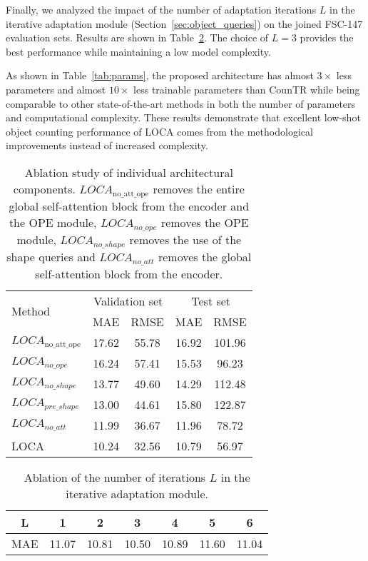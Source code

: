 \documentclass[10pt,twocolumn,letterpaper]{article}
\begin{document}
Finally, we analyzed the impact of the number of adaptation iterations $L$ in the iterative adaptation module (Section~\ref{sec:object_queries}) on the joined FSC-147 evaluation sets. 
Results are shown in Table~\ref{tab:ablation_L}. 
The choice of $L=3$ provides the best performance while maintaining a low model complexity.

 As shown in Table~\ref{tab:params}, the proposed architecture has almost $3 \times$ less parameters and almost $10 \times$ less trainable parameters than CounTR while being comparable to other state-of-the-art methods in both the number of parameters and computational complexity.
These results demonstrate that excellent low-shot object counting performance of LOCA comes from the methodological improvements instead of increased complexity.



\begin{table}[htbp]
    \centering
    \begin{tabular}{l c c c c}
        \toprule
        \multirow{2}{*}{Method}& \multicolumn{2}{c}{Validation set} & \multicolumn{2}{c}{Test set} \\
        & MAE & RMSE & MAE & RMSE \\ 
        \midrule
        $LOCA_\mathrm{no\_att\_ope}$  & 17.62 & 55.78 & 16.92 & 101.96 \\
        $LOCA_{no\_ope}$  & 16.24 & 57.41 & 15.53 & 96.23 \\
        $LOCA_{no\_shape}$   & 13.77 & 49.60 & 14.29 & 112.48 \\
        $LOCA_{pre\_shape}$   & 13.00 & 44.61 & 15.80 & 122.87 \\
        $LOCA_{no\_att}$ & 11.99 & 36.67 & 11.96 & 78.72 \\
        LOCA               & 10.24 & 32.56 & 10.79 & 56.97 \\
        \bottomrule
    \end{tabular}
    \caption{Ablation study of individual architectural components. $LOCA_\mathrm{no\_att\_ope}$ removes the entire global self-attention block from the encoder and the OPE module,  $LOCA_{no\_ope}$ removes the OPE module, $LOCA_{no\_shape}$ removes the use of the shape queries and $LOCA_{no\_att}$ removes the global self-attention block from the encoder.}
    \label{tab:ablation_components}
\end{table}





\begin{table}[htbp]
    \centering
    \begin{tabular}{c c c c c c c}
        \toprule
        L & 1 & 2 & 3 & 4 & 5 & 6\\ 
        \midrule
        MAE & 11.07 & 10.81 & 10.50 & 10.89 & 11.60 & 11.04 \\
        \bottomrule
    \end{tabular}
    \caption{Ablation of the number of iterations $L$ in the iterative adaptation module. }
    \label{tab:ablation_L}
\end{table}
\end{document}
